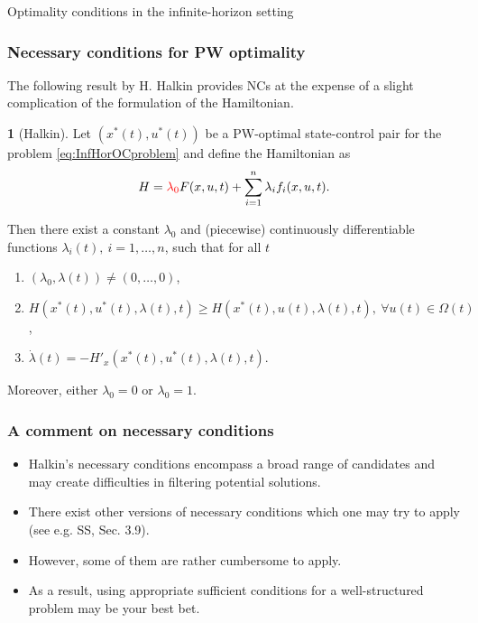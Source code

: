 \documentclass[10pt]{beamer}
\theoremstyle{definition}
\newtheorem{Fact}{\translate{Fact}}
\begin{document}
\begin{section}{Optimality conditions in the infinite-horizon setting}\label{sec:NCsSCs}

\begin{frame}[fragile]
\frametitle{Necessary conditions for PW optimality}
The following result by H. Halkin provides NCs at the expense of a slight complication of the formulation of the Hamiltonian.

\begin{Fact}[Halkin]
Let $ (x^*(t),u^*(t) ) $ be a PW-optimal state-control pair for the problem \eqref{eq:InfHorOCproblem} and define the Hamiltonian as \begin{equation}
H = \textcolor{red}{\lambda_0} F(x,u,t) + \sum_{i=1}^{n}\lambda_i f_i(x,u,t).
\label{eq:HamiltP0}
\end{equation}

Then there exist a constant $ \lambda_0 $ and (piecewise) continuously differentiable functions $ \lambda_i(t),~i=1,\ldots,n $, such that for all $ t $
\begin{enumerate}
\item $ (\lambda_0,\lambda(t)) \neq (0,\ldots,0)$,
\item $ H(x^*(t),u^*(t),\lambda(t),t )\geq H(x^*(t),u(t),\lambda(t),t ),~\forall u(t)\in \Omega(t) $,
\item $ \dot{\lambda}(t) = -H'_x(x^*(t),u^*(t),\lambda(t),t) $.
\end{enumerate}

Moreover, either $ \lambda_0=0 $ or $ \lambda_0=1 $.
\label{fc:HalkinNCs}
\end{Fact}
\end{frame}

\begin{frame}[fragile]
\frametitle{A comment on necessary conditions}
\begin{itemize}\itemsep1em
\item Halkin's necessary conditions encompass a broad range of candidates and may create difficulties in filtering potential solutions.
\item There exist other versions of necessary conditions which one may try to apply (see e.g. SS, Sec. 3.9).
\item However, some of them are rather cumbersome to apply.
\item As a result, using appropriate sufficient conditions for a well-structured problem may be your best bet.
\end{itemize}
\end{frame}


\end{section}
\end{document}
